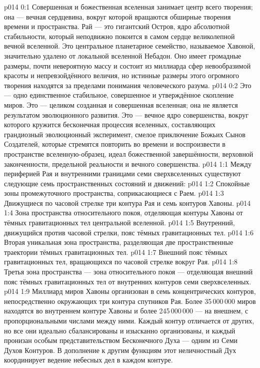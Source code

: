 \author{Совершенствователь Мудрости}
\vs p014 0:1 Совершенная и божественная вселенная занимает центр всего творения; она --- вечная сердцевина, вокруг которой вращаются обширные творения времени и пространства. Рай --- это гигантский Остров, ядро абсолютной стабильности, который неподвижно покоится в самом сердце великолепной вечной вселенной. Это центральное планетарное семейство, называемое Хавоной, значительно удалено от локальной вселенной Небадон. Оно имеет громадные размеры, почти невероятную массу и состоит из миллиарда сфер невообразимой красоты и непревзойдённого величия, но истинные размеры этого огромного творения находятся за пределами понимания человеческого разума.
\vs p014 0:2 Это --- одно единственное стабильное, совершенное и утверждённое скопление миров. Это --- целиком созданная и совершенная вселенная; она не является результатом эволюционного развития. Это --- вечное ядро совершенства, вокруг которого кружится бесконечная процессия вселенных, составляющих грандиозный эволюционный эксперимент, смелое приключение Божьих Сынов Создателей, которые стремятся повторить во времени и воспроизвести в пространстве вселенную\hyp{}образец, идеал божественной завершённости, верховной законченности, предельной реальности и вечного совершенства.
\vs p014 1:1 Между периферией Рая и внутренними границами семи сверхвселенных существуют следующие семь пространственных состояний и движений:
\vs p014 1:2 Спокойные зоны промежуточного пространства, соприкасающиеся с Раем.
\vs p014 1:3 Движущиеся по часовой стрелке три контура Рая и семь контуров Хавоны.
\vs p014 1:4 Зона пространства относительного покоя, отделяющая контуры Хавоны от тёмных гравитационных тел центральной вселенной.
\vs p014 1:5 Внутренний, движущийся против часовой стрелки, пояс тёмных гравитационных тел.
\vs p014 1:6 Вторая уникальная зона пространства, разделяющая две пространственные траектории тёмных гравитационных тел.
\vs p014 1:7 Внешний пояс тёмных гравитационных тел, вращающихся по часовой стрелке вокруг Рая.
\vs p014 1:8 Третья зона пространства --- зона относительного покоя --- отделяющая внешний пояс тёмных гравитационных тел от внутренних контуров семи сверхвселенных.
\vs p014 1:9 \pc Миллиард миров Хавоны организован в семь концентрических контуров, непосредственно окружающих три контура спутников Рая. Более 35\,000\,000 миров находятся во внутреннем контуре Хавоны и более 245\,000\,000 --- на внешнем, с пропорциональными числами между ними. Каждый контур отличается от других, но все они идеально сбалансированы и изысканно организованы, и каждый пронизан особым представительством Бесконечного Духа --- одним из Семи Духов Контуров. В дополнение к другим функциям этот неличностный Дух координирует ведение небесных дел в каждом контуре.

